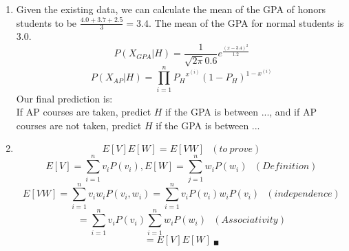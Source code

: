 \documentclass{article}
\begin{document}
\begin{enumerate}
        \item
            Given the existing data, we can calculate the mean of the GPA of
            honors students to be $ \frac{4.0 + 3.7 + 2.5}{3} = 3.4 $. The mean of the GPA for normal 			  students is 3.0.
            $$ P( X_{GPA} | H ) = \frac{1}{\sqrt{2 \pi} 0.6} e^{\frac{(x - 3.4)^2 }{1.2} }$$
            $$ P( X_{AP}  | H) = \prod\limits_{i = 1}^{n} {P_H}^{x^{(i)}}(1 - P_H)^{1 - x^{(i)}} $$
            Our final prediction is: \\
            If AP courses are taken, predict $H$ if the GPA is between ..., and
            if AP courses are not taken, predict $H$ if the GPA is between ... \\
        \item
            $$ E[V]E[W] = E[VW] \ \ \ (to\ prove)$$
            $$ E[V] = \sum_{i = 1}^{n} v_i P(v_i), E[W] = \sum_{j = 1}^{n} w_i P(w_i) \ \ \ (Definition)$$
            $$ E[VW] = \sum_{i = 1}^{n} v_iw_iP(v_i, w_i) = \sum_{i = 1}^{n} v_iP(v_i)w_iP(v_i) \ \ \ (independence)$$
            $$ = \sum_{i = 1}^{n} v_i P(v_i) \sum_{i = 1}^{n} w_i P(w_i) \ \ \ (Associativity)$$
            $$ = E[V]E[W]\ _\blacksquare$$
\end{enumerate}
\end{document}
